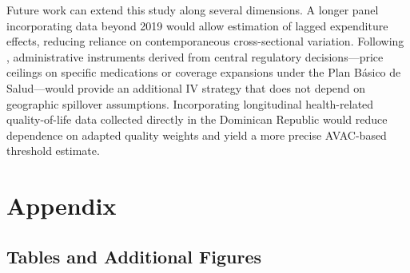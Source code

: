 \documentclass[11pt]{article}
\numberwithin{equation}{section}
\theoremstyle{remark}
\begin{document}
Future work can extend this study along several dimensions. A longer panel incorporating data beyond 2019 would allow estimation of lagged expenditure effects, reducing reliance on contemporaneous cross-sectional variation. Following \citet{Espinosa2021}, administrative instruments derived from central regulatory decisions---price ceilings on specific medications or coverage expansions under the Plan Básico de Salud---would provide an additional IV strategy that does not depend on geographic spillover assumptions. Incorporating longitudinal health-related quality-of-life data collected directly in the Dominican Republic would reduce dependence on adapted quality weights and yield a more precise AVAC-based threshold estimate.

\newpage

\printbibliography[title={References}]

\newpage
\appendix
{}

\section{Appendix}

\subsection{Tables and Additional Figures}


\begin{table}[H]
    \caption{\label{Tab: SummaryMortalidad} Descriptive statistics of mortality data}
    \centering
\end{table}



\begin{table}[H]
    \caption{\label{Tab: TNV1} National life table I, 2015-2020}
    \centering
    \hspace*{-1cm}
\end{table}
\end{document}
